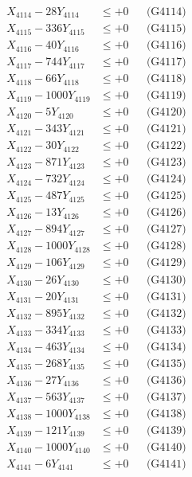 \documentclass[a4paper,10pt]{article}
\begin{document}
{\begin{align}
X_{4114} - 28Y_{4114} &\leq +0 && \text{(G4114)} \\
X_{4115} - 336Y_{4115} &\leq +0 && \text{(G4115)} \\
X_{4116} - 40Y_{4116} &\leq +0 && \text{(G4116)} \\
X_{4117} - 744Y_{4117} &\leq +0 && \text{(G4117)} \\
X_{4118} - 66Y_{4118} &\leq +0 && \text{(G4118)} \\
X_{4119} - 1000Y_{4119} &\leq +0 && \text{(G4119)} \\
X_{4120} - 5Y_{4120} &\leq +0 && \text{(G4120)} \\
\allowbreak
X_{4121} - 343Y_{4121} &\leq +0 && \text{(G4121)} \\
X_{4122} - 30Y_{4122} &\leq +0 && \text{(G4122)} \\
X_{4123} - 871Y_{4123} &\leq +0 && \text{(G4123)} \\
X_{4124} - 732Y_{4124} &\leq +0 && \text{(G4124)} \\
X_{4125} - 487Y_{4125} &\leq +0 && \text{(G4125)} \\
X_{4126} - 13Y_{4126} &\leq +0 && \text{(G4126)} \\
X_{4127} - 894Y_{4127} &\leq +0 && \text{(G4127)} \\
X_{4128} - 1000Y_{4128} &\leq +0 && \text{(G4128)} \\
X_{4129} - 106Y_{4129} &\leq +0 && \text{(G4129)} \\
X_{4130} - 26Y_{4130} &\leq +0 && \text{(G4130)} \\
\allowbreak
X_{4131} - 20Y_{4131} &\leq +0 && \text{(G4131)} \\
X_{4132} - 895Y_{4132} &\leq +0 && \text{(G4132)} \\
X_{4133} - 334Y_{4133} &\leq +0 && \text{(G4133)} \\
X_{4134} - 463Y_{4134} &\leq +0 && \text{(G4134)} \\
X_{4135} - 268Y_{4135} &\leq +0 && \text{(G4135)} \\
X_{4136} - 27Y_{4136} &\leq +0 && \text{(G4136)} \\
X_{4137} - 563Y_{4137} &\leq +0 && \text{(G4137)} \\
X_{4138} - 1000Y_{4138} &\leq +0 && \text{(G4138)} \\
X_{4139} - 121Y_{4139} &\leq +0 && \text{(G4139)} \\
X_{4140} - 1000Y_{4140} &\leq +0 && \text{(G4140)} \\
\allowbreak
X_{4141} - 6Y_{4141} &\leq +0 && \text{(G4141)} \\

\end{align}}
\end{document}
